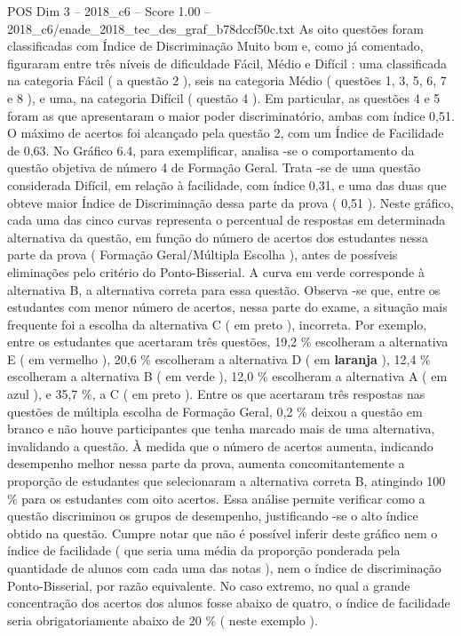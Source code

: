 \begin{textsample}{POS Dim 3 – 2018\_c6 – Score 1.00 – 2018\_c6/enade\_2018\_tec\_des\_graf\_b78dccf50c.txt}
As oito questões foram classificadas com Índice de Discriminação Muito bom e, como já comentado, figuraram entre três níveis de dificuldade Fácil, Médio e Difícil : uma classificada na categoria Fácil ( a questão 2 ), seis na categoria Médio ( questões 1, 3, 5, 6, 7 e 8 ), e uma, na categoria Difícil ( questão 4 ).
Em particular, as questões 4 e 5 foram as que apresentaram o maior poder discriminatório, ambas com índice 0,51.
O máximo de acertos foi alcançado pela questão 2, com um Índice de Facilidade de 0,63.
No Gráfico 6.4, para exemplificar, analisa -se o comportamento da questão objetiva de número 4 de Formação Geral.
Trata -se de uma questão considerada Difícil, em relação à facilidade, com índice 0,31, e uma das duas que obteve maior Índice de Discriminação dessa parte da prova ( 0,51 ).
Neste gráfico, cada uma das cinco curvas representa o percentual de respostas em determinada alternativa da questão, em função do número de acertos dos estudantes nessa parte da prova ( Formação Geral/Múltipla Escolha ), antes de possíveis eliminações pelo critério do Ponto-Bisserial.
A curva em verde corresponde à alternativa B, a alternativa correta para essa questão.
Observa -se que, entre os estudantes com menor número de acertos, nessa parte do exame, a situação mais frequente foi a escolha da alternativa C ( em preto ), incorreta.
Por exemplo, entre os estudantes que acertaram três questões, 19,2 \% escolheram a alternativa E ( em vermelho ), 20,6 \% escolheram a alternativa D ( em \textbf{laranja} ), 12,4 \% escolheram a alternativa B ( em verde ), 12,0 \% escolheram a alternativa A ( em azul ), e 35,7 \%, a C ( em preto ).
Entre os que acertaram três respostas nas questões de múltipla escolha de Formação Geral, 0,2 \% deixou a questão em branco e não houve participantes que tenha marcado mais de uma alternativa, invalidando a questão.
À medida que o número de acertos aumenta, indicando desempenho melhor nessa parte da prova, aumenta concomitantemente a proporção de estudantes que selecionaram a alternativa correta B, atingindo 100 \% para os estudantes com oito acertos.
Essa análise permite verificar como a questão discriminou os grupos de desempenho, justificando -se o alto índice obtido na questão.
Cumpre notar que não é possível inferir deste gráfico nem o índice de facilidade ( que seria uma média da proporção ponderada pela quantidade de alunos com cada uma das notas ), nem o índice de discriminação Ponto-Bisserial, por razão equivalente.
No caso extremo, no qual a grande concentração dos acertos dos alunos fosse abaixo de quatro, o índice de facilidade seria obrigatoriamente abaixo de 20 \% ( neste exemplo ).

\end{textsample}
